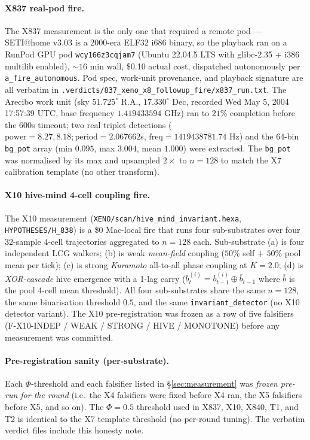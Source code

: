 \documentclass[11pt,a4paper]{article}
\begin{document}
\paragraph{X837 real-pod fire.}
The X837 measurement \citep{xeno_h837_setiathome} is the only one that
required a remote pod ---
SETI@home v3.03 is a 2000-era ELF32 i686 binary, so the playback ran on a
RunPod GPU pod \texttt{wcy166z3cqjam7} (Ubuntu 22.04.5 LTS with glibc-2.35
+ i386 multilib enabled), $\sim 16$ min wall, \$0.10 actual cost, dispatched
autonomously per \texttt{a\_fire\_autonomous}. Pod spec, work-unit
provenance, and playback signature are all verbatim in
\texttt{.verdicts/837\_xeno\_x8\_followup\_fire/x837\_run.txt}. The Arecibo
work unit (sky $51.725^\circ$ R.A., $17.330^\circ$ Dec, recorded
Wed May 5, 2004 17:57:39 UTC, base frequency $1.419433594$ GHz) ran to
$21\%$ completion before the $600$s timeout; two real triplet detections
($\text{power}=8.27, 8.18; \text{period}=2.067662$s,
$\text{freq}=1419438781.74$ Hz) and the $64$-bin \texttt{bg\_pot} array
(min $0.095$, max $3.004$, mean $1.000$) were extracted. The
\texttt{bg\_pot} was normalised by its max and upsampled $2\times$ to
$n=128$ to match the X7 calibration template (no other transform).

\paragraph{X10 hive-mind 4-cell coupling fire.}
The X10 measurement \citep{xeno_h838_x10}
(\texttt{XENO/scan/hive\_mind\_invariant.hexa},
\texttt{HYPOTHESES/H\_838}) is a \$0 Mac-local fire that runs four
sub-substrates over four 32-sample 4-cell trajectories aggregated to
$n=128$ each. Sub-substrate (a) is four independent LCG walkers; (b) is
weak \emph{mean-field} coupling ($50\%$ self $+$ $50\%$ pool mean per
tick); (c) is strong \emph{Kuramoto} all-to-all phase coupling at
$K=2.0$; (d) is \emph{XOR-cascade} hive emergence with a 1-lag carry
($b^{(i)}_t = b^{(i)}_{t-1} \oplus \overline{b}_{t-1}$ where
$\overline{b}$ is the pool 4-cell mean threshold). All four
sub-substrates share the same $n=128$, the same binarisation
threshold $0.5$, and the same \texttt{invariant\_detector} (no X10
detector variant). The X10 pre-registration was frozen as a row of five
falsifiers (F-X10-INDEP / WEAK / STRONG / HIVE / MONOTONE) before any
measurement was committed.

\paragraph{Pre-registration sanity (per-substrate).}
Each $\Phi$-threshold and each falsifier listed in \S\ref{sec:measurement}
was \emph{frozen pre-run for the round} (i.e.\ the X4 falsifiers were
fixed before X4 ran, the X5 falsifiers before X5, and so on). The
$\Phi=0.5$ threshold used in X837, X10, X840, T1, and T2 is identical
to the X7 template threshold (no per-round tuning). The verbatim
verdict files include this honesty note.
\end{document}
